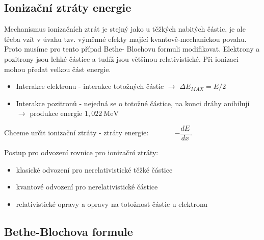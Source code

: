 \documentclass[../../main.tex]{subfiles}
\begin{document}
\subsection{Ionizační ztráty energie}

Mechanismus ionizačních ztrát je stejný jako u těžkých nabitých částic, je ale třeba vzít v úvahu tzv. výměnné efekty mající kvantově-mechanickou povahu. Proto musíme pro tento případ Bethe- Blochovu formuli modifikovat. Elektrony a pozitrony jsou lehké částice a tudíž jsou většinou relativistické. Při ionizaci mohou předat velkou část energie. 

\begin{itemize}
	\item Interakce elektronu - interakce totožných částic $\rightarrow$ $\Delta E_{MAX} = E/2$
	\item Interakce pozitronů - nejedná se o totožné částice, na konci dráhy anihilují $\rightarrow$ produkce energie $1,022 ~\mathrm{MeV} $
\end{itemize}

Chceme určit ionizační ztráty - ztráty energie: ~~~~~~ $ - \dfrac{dE}{dx}$.

Postup pro odvození rovnice pro ionizační ztráty:
\begin{itemize}
	\item klasické odvození pro nerelativistické těžké částice
	\item kvantové odvození  pro nerelativistické částice
	\item relativistické opravy a opravy na totožnost částic u elektronu	
\end{itemize}


\subsection{Bethe-Blochova formule}
\end{document}
